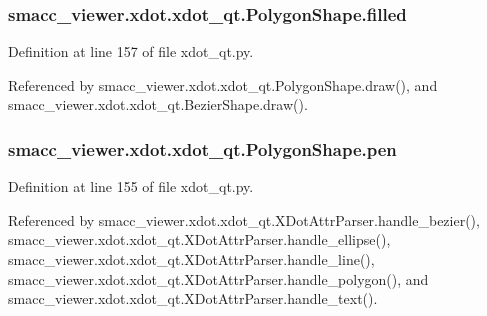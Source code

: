 \subsubsection[{\texorpdfstring{filled}{filled}}]{\setlength{\rightskip}{0pt plus 5cm}smacc\+\_\+viewer.\+xdot.\+xdot\+\_\+qt.\+Polygon\+Shape.\+filled}\hypertarget{classsmacc__viewer_1_1xdot_1_1xdot__qt_1_1PolygonShape_a7e3ac7cdc3243a36dc0068d180673a71}{}\label{classsmacc__viewer_1_1xdot_1_1xdot__qt_1_1PolygonShape_a7e3ac7cdc3243a36dc0068d180673a71}


Definition at line 157 of file xdot\+\_\+qt.\+py.



Referenced by smacc\+\_\+viewer.\+xdot.\+xdot\+\_\+qt.\+Polygon\+Shape.\+draw(), and smacc\+\_\+viewer.\+xdot.\+xdot\+\_\+qt.\+Bezier\+Shape.\+draw().

\subsubsection[{\texorpdfstring{pen}{pen}}]{\setlength{\rightskip}{0pt plus 5cm}smacc\+\_\+viewer.\+xdot.\+xdot\+\_\+qt.\+Polygon\+Shape.\+pen}\hypertarget{classsmacc__viewer_1_1xdot_1_1xdot__qt_1_1PolygonShape_a483a5be59c36935b9caa0ac404f398de}{}\label{classsmacc__viewer_1_1xdot_1_1xdot__qt_1_1PolygonShape_a483a5be59c36935b9caa0ac404f398de}


Definition at line 155 of file xdot\+\_\+qt.\+py.



Referenced by smacc\+\_\+viewer.\+xdot.\+xdot\+\_\+qt.\+X\+Dot\+Attr\+Parser.\+handle\+\_\+bezier(), smacc\+\_\+viewer.\+xdot.\+xdot\+\_\+qt.\+X\+Dot\+Attr\+Parser.\+handle\+\_\+ellipse(), smacc\+\_\+viewer.\+xdot.\+xdot\+\_\+qt.\+X\+Dot\+Attr\+Parser.\+handle\+\_\+line(), smacc\+\_\+viewer.\+xdot.\+xdot\+\_\+qt.\+X\+Dot\+Attr\+Parser.\+handle\+\_\+polygon(), and smacc\+\_\+viewer.\+xdot.\+xdot\+\_\+qt.\+X\+Dot\+Attr\+Parser.\+handle\+\_\+text().

